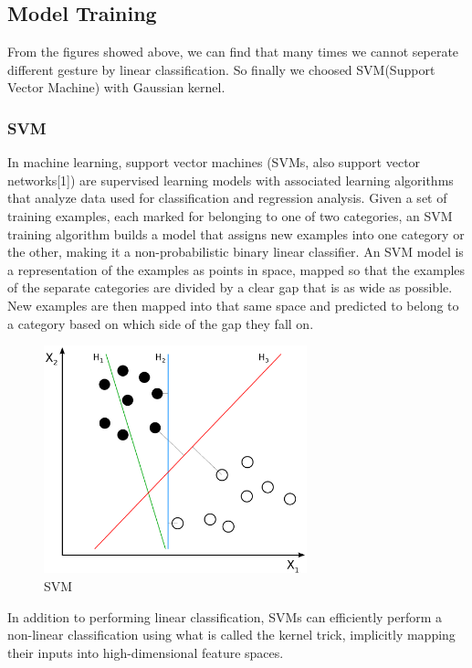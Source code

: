 \documentclass[conference]{IEEEtran}
\begin{document}
\subsection{Model Training}
From the figures showed above, we can find that many times we cannot seperate different gesture by linear classification. So finally we choosed SVM(Support Vector Machine) with Gaussian kernel.

\subsubsection{SVM}
In machine learning, support vector machines (SVMs, also support vector networks[1]) are supervised learning models with associated learning algorithms that analyze data used for classification and regression analysis. Given a set of training examples, each marked for belonging to one of two categories, an SVM training algorithm builds a model that assigns new examples into one category or the other, making it a non-probabilistic binary linear classifier. An SVM model is a representation of the examples as points in space, mapped so that the examples of the separate categories are divided by a clear gap that is as wide as possible. New examples are then mapped into that same space and predicted to belong to a category based on which side of the gap they fall on.
\begin{figure}[H]
\centering
\includegraphics[width=3in]{svm1.png}
\caption{SVM}
\end{figure}
In addition to performing linear classification, SVMs can efficiently perform a non-linear classification using what is called the kernel trick, implicitly mapping their inputs into high-dimensional feature spaces.
\end{document}
